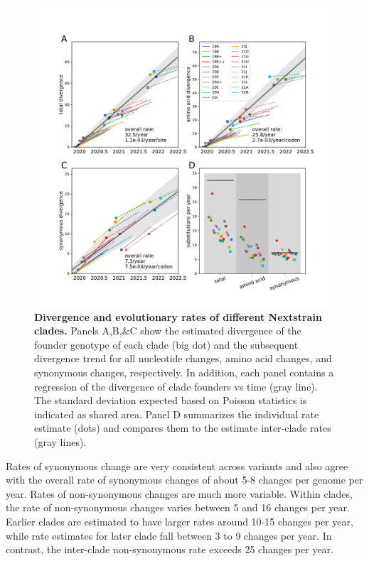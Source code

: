 \documentclass[aps,rmp, twocolumn]{revtex4}
\begin{document}
\begin{figure}
    \includegraphics[width=\textwidth]{figures/rate_summary.pdf}
    \caption[]{{\bf Divergence and evolutionary rates of different Nextstrain clades.} Panels A,B,\&C show the estimated divergence of the founder genotype of each clade (big dot) and the subsequent divergence trend for all nucleotide changes, amino acid changes, and synonymous changes, respectively. In addition, each panel contains a regression of the divergence of clade founders vs time (gray line).
    The standard deviation expected based on Poisson statistics is indicated as shared area.
    Panel D summarizes the individual rate estimate (dots) and compares them to the estimate inter-clade rates (gray lines).
    \label{fig:rate_summary} }
\end{figure}

Rates of synonymous change are very consistent across variants and also agree with the overall rate of synonymous changes of about 5-8 changes per genome per year.
Rates of non-synonymous changes are much more variable.
Within clades, the rate of non-synonymous changes varies between 5 and 16 changes per year.
Earlier clades are estimated to have larger rates around 10-15 changes per year, while rate estimates for later clade fall  between 3 to 9 changes per year.
In contrast, the inter-clade non-synonymous rate exceeds 25 changes per year.
\end{document}
